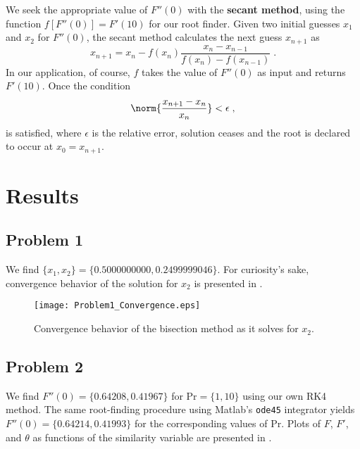 \documentclass[12pt]{article}
\begin{document}
We seek the appropriate value of $F''(0)$ with the \textbf{secant method}, using the function $f[F''(0)] = F'(10)$ for our root finder. Given two initial guesses $x_1$ and $x_2$ for $F''(0)$, the secant method calculates the next guess $x_{n+1}$ as
\begin{equation}
x_{n+1} = x_n - f(x_n) \frac{x_n - x_{n-1}}{f(x_n) - f(x_{n-1})}
\;.
\label{eq:secant}
\end{equation}
In our application, of course, $f$ takes the value of $F''(0)$ as input and returns $F'(10)$. Once the condition
\begin{equation}
\norm{\frac{x_{n+1} - x_n}{x_n}} < \epsilon
\;,
\label{eq:secant_relerr}
\end{equation}
is satisfied, where $\epsilon$ is the relative error, solution ceases and the root is declared to occur at $x_0 = x_{n+1}$.

\section{Results} %

\subsection{Problem 1}

We find $\{ x_1, x_2 \} = \{ 0.5000000000, 0.2499999046 \}$. For curiosity's sake, convergence behavior of the solution for $x_2$ is presented in .

\begin{figure}[h!]
\begin{center}
\texttt{[image: Problem1\_Convergence.eps]}
\\
\caption{Convergence behavior of the bisection method as it solves for $x_2$.}
\label{fig:prob1_convergence}
\end{center}
\end{figure}

\subsection{Problem 2}

We find $F''(0) = \{0.64208, 0.41967\}$ for $\text{Pr} = \{1, 10\}$ using our own RK4 method. The same root-finding procedure using Matlab's \lstinline|ode45| integrator yields $F''(0) = \{0.64214, 0.41993\}$ for the corresponding values of Pr. Plots of $F$, $F'$, and $\theta$ as functions of the similarity variable are presented in .
\end{document}
